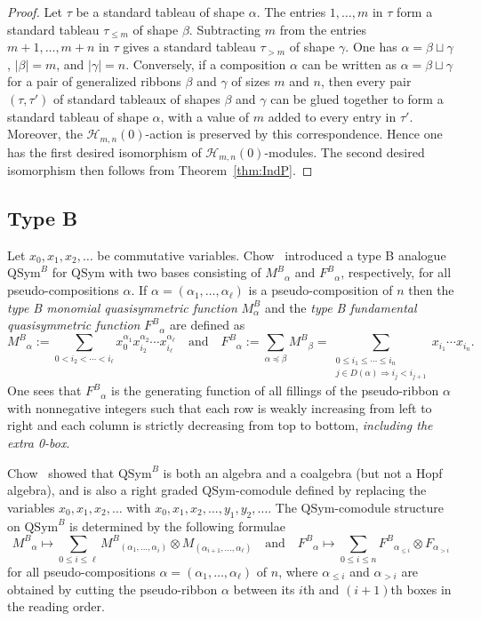 \documentclass{amsart}
\newtheorem*{Young's Rule}{Young's Rule}
\theoremstyle{definition}
\theoremstyle{remark}
\numberwithin{equation}{section}
\begin{document}
\begin{proof}
Let $\tau$ be a standard tableau of shape $\alpha$. The entries $1,\ldots,m$ in $\tau$ form a standard tableau $\tau_{\le m}$ of shape $\beta$. Subtracting $m$ from the entries $m+1,\ldots,m+n$ in $\tau$ gives a standard tableau $\tau_{>m}$ of shape $\gamma$. One has $\alpha=\beta\sqcup\gamma$, $|\beta|=m$, and $|\gamma|=n$. Conversely, if a composition $\alpha$ can be written as $\alpha=\beta \sqcup\gamma$ for a pair of generalized ribbons $\beta$ and $\gamma$ of sizes $m$ and $n$, then every pair $(\tau,\tau')$ of standard tableaux of shapes $\beta$ and $\gamma$ can be glued together to form a standard tableau of shape $\alpha$, with a value of $m$ added to every entry in $\tau'$. Moreover, the ${\mathcal{H}}_{m,n}(0)$-action is preserved by this correspondence. Hence one has the first desired isomorphism of ${\mathcal{H}}_{m,n}(0)$-modules. The second desired isomorphism then follows from Theorem~\ref{thm:IndP}.
\end{proof}

\subsection{Type B}
Let $x_0,x_1,x_2,\ldots$ be commutative variables. Chow~\cite{Chow} introduced a type B analogue ${\mathrm{QSym}}^B$ for ${\mathrm{QSym}}$ with two bases consisting of ${M^B}_\alpha$ and ${F^B}_\alpha$, respectively, for all pseudo-compositions $\alpha$. If $\alpha=(\alpha_1,\ldots,\alpha_\ell)$ is a pseudo-composition of $n$ then the \emph{type B monomial quasisymmetric function} $M^B_\alpha$ and the \emph{type B fundamental quasisymmetric function} ${F^B}_\alpha$ are defined as
\[ {M^B}_\alpha:=\sum_{0<i_2<\cdots<i_\ell} x_0^{\alpha_1}x_{i_2}^{\alpha_2}\cdots x_{i_\ell}^{\alpha_\ell}
{\quad\text{and}\quad} {F^B}_\alpha:=\sum_{\alpha{\operatorname{\preccurlyeq}}\beta}{M^B}_\beta = \sum_{ \substack{ 0\le i_1\le \cdots\le i_n\\ j\in D(\alpha) \Rightarrow i_j<i_{j+1} }} x_{i_1}\cdots x_{i_n}. \]
One sees that ${F^B}_\alpha$ is the generating function of all fillings of the pseudo-ribbon $\alpha$ with nonnegative integers such that each row is weakly increasing from left to right and each column is strictly decreasing from top to bottom, \emph{including the extra 0-box}.  

Chow~\cite{Chow} showed that ${\mathrm{QSym}}^B$ is both an algebra and a coalgebra (but not a Hopf algebra), and is also a right graded ${\mathrm{QSym}}$-comodule defined by replacing the variables $x_0,x_1,x_2,\ldots$ with $x_0,x_1,x_2,\ldots,y_1,y_2,\ldots$. 
The ${\mathrm{QSym}}$-comodule structure on ${\mathrm{QSym}}^B$ is determined by the following formulae
\[ {M^B}_\alpha \mapsto \sum_{0\le i\le\ell} {M^B}_{(\alpha_1,\ldots,\alpha_i)}\otimes M_{(\alpha_{i+1},\ldots,\alpha_\ell)} {\quad\text{and}\quad}
 {F^B}_\alpha \mapsto \sum_{0\le i\le n} {F^B}_{\alpha_{\le i}}\otimes F_{\alpha_{>i}}  \]
for all pseudo-compositions $\alpha=(\alpha_1,\ldots,\alpha_\ell)$ of $n$, where $\alpha_{\le i}$ and $\alpha_{>i}$ are obtained by cutting the pseudo-ribbon $\alpha$ between its $i$th and $(i+1)$th boxes in the reading order.  
\end{document}
